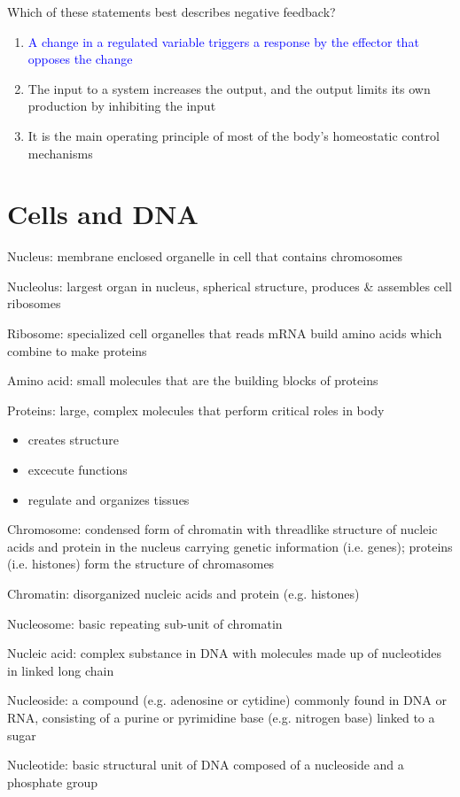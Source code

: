 \documentclass[11pt,fleqn]{book}
\begin{document}
\begin{exercise}
    Which of these statements best describes negative feedback?
    \begin{enumerate}
        \item \textcolor{blue}{A change in a regulated variable triggers a response by the effector that opposes the change}
        \item The input to a system increases the output, and the output limits its own production by inhibiting the input
        \item It is the main operating principle of most of the body’s homeostatic control mechanisms
    \end{enumerate}
\end{exercise}

\section{Cells and DNA}
\begin{descriptions}
    \item[Nucleus:] membrane enclosed organelle in cell that contains chromosomes
    \item[Nucleolus:] largest organ in nucleus, spherical structure, produces \& assembles cell ribosomes
    \item[Ribosome:] specialized cell organelles that reads mRNA build amino acids which combine to make proteins
    \item[Amino acid:] small molecules that are the building blocks of proteins
    \item[Proteins:] large, complex molecules that perform critical roles in body
    \begin{itemize}
        \item creates structure
        \item excecute functions
        \item regulate and organizes tissues
    \end{itemize}
    \item[Chromosome:] condensed form of chromatin with threadlike structure of nucleic acids and protein in the nucleus carrying genetic information (i.e. genes); proteins (i.e. histones) form the structure of chromasomes
    \item[Chromatin:] disorganized nucleic acids and protein (e.g. histones)
    \item[Nucleosome:] basic repeating sub-unit of chromatin
    \item[Nucleic acid:] complex substance in DNA with molecules made up of nucleotides in linked long chain
    \item[Nucleoside:] a compound (e.g. adenosine or cytidine) commonly found in DNA or RNA, consisting of a purine or pyrimidine base (e.g. nitrogen base) linked to a sugar
    \item[Nucleotide:] basic structural unit of DNA composed of a nucleoside and a phosphate group
\end{descriptions}
\end{document}
